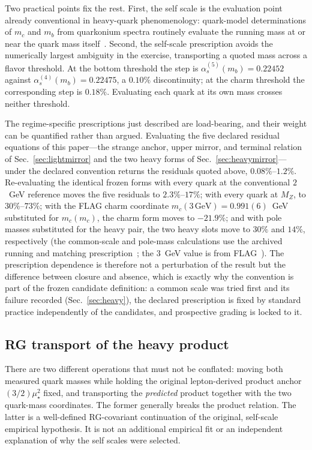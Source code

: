 \documentclass[aps,twocolumn,superscriptaddress,nofootinbib,floatfix]{revtex4-2}
\newcommand{\mstar}{\mu_\star}
\begin{document}
Two practical points fix the rest. First, the self scale is the evaluation point already conventional in heavy-quark phenomenology: quark-model determinations of $m_c$ and $m_b$ from quarkonium spectra routinely evaluate the running mass at or near the quark mass itself~\cite{PDG2026}. Second, the self-scale prescription avoids the numerically largest ambiguity in the exercise, transporting a quoted mass across a flavor threshold. At the bottom threshold the step is $\alpha_s^{(5)}(m_b)=0.22452$ against $\alpha_s^{(4)}(m_b)=0.22475$, a $0.10\%$ discontinuity; at the charm threshold the corresponding step is $0.18\%$. Evaluating each quark at its own mass crosses neither threshold.

The regime-specific prescriptions just described are load-bearing, and their weight can be quantified rather than argued. Evaluating the five declared residual equations of this paper---the strange anchor, upper mirror, and terminal relation of Sec.~\ref{sec:lightmirror} and the two heavy forms of Sec.~\ref{sec:heavymirror}---under the declared convention returns the residuals quoted above, $0.08\%$--$1.2\%$. Re-evaluating the identical frozen forms with every quark at the conventional $2$~GeV reference moves the five residuals to $2.3\%$--$17\%$; with every quark at $M_Z$, to $30\%$--$73\%$; with the FLAG charm coordinate $m_c(3\,\mathrm{GeV})=0.991(6)$~GeV substituted for $m_c(m_c)$, the charm form moves to $-21.9\%$; and with pole masses substituted for the heavy pair, the two heavy slots move to $30\%$ and $14\%$, respectively (the common-scale and pole-mass calculations use the archived running and matching prescription~\cite{BrilliantZenodoSupp}; the $3$~GeV value is from FLAG~\cite{FLAG2024}). The prescription dependence is therefore not a perturbation of the result but the difference between closure and absence, which is exactly why the convention is part of the frozen candidate definition: a common scale was tried first and its failure recorded (Sec.~\ref{sec:heavy}), the declared prescription is fixed by standard practice independently of the candidates, and prospective grading is locked to it.

\subsection{RG transport of the heavy product}
\label{sec:rgtransport}

There are two different operations that must not be conflated: moving both measured quark masses while holding the original lepton-derived product anchor $(3/2)\mstar^2$ fixed, and transporting the \emph{predicted} product together with the two quark-mass coordinates. The former generally breaks the product relation. The latter is a well-defined RG-covariant continuation of the original, self-scale empirical hypothesis. It is not an additional empirical fit or an independent explanation of why the self scales were selected.
\end{document}
